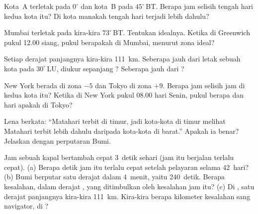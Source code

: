 \begin{exercise}[$\star\star$]\label{exo:g6:latitude-longitude:6}
Kota~A terletak pada  $0^\circ$ dan kota~B pada  $45^\circ$\,BT.
Berapa jam selisih tengah hari kedua kota itu? Di kota manakah tengah hari
terjadi lebih dahulu?
\end{exercise}

\begin{exercise}[$\star\star$]\label{exo:g6:latitude-longitude:7}
Mumbai terletak pada kira-kira $73^\circ$\,BT. Tentukan  idealnya.
Ketika di Greenwich pukul 12.00 siang, pukul berapakah di Mumbai, menurut
zona ideal?
\end{exercise}

\begin{exercise}[$\star\star$]\label{exo:g6:latitude-longitude:8}
Setiap derajat  panjangnya kira-kira \qty{111}{km}. Seberapa jauh dari
 letak sebuah kota pada $30^\circ$\,LU, diukur sepanjang
? Seberapa jauh  dari ?
\end{exercise}

\begin{exercise}[$\star\star$]\label{exo:g6:latitude-longitude:9}
New York berada di zona $-5$ dan Tokyo di zona $+9$. Berapa jam selisih jam
di kedua kota itu? Ketika di New York pukul 08.00 hari Senin, pukul berapa
dan hari apakah di Tokyo?
\end{exercise}

\begin{exercise}[$\star\star$]\label{exo:g6:latitude-longitude:10}
Lena berkata: ``Matahari terbit di timur, jadi kota-kota di timur melihat
Matahari terbit lebih dahulu daripada kota-kota di barat.'' Apakah ia benar?
Jelaskan dengan perputaran Bumi.
\end{exercise}

\begin{exercise}[$\star\star\star$]\label{exo:g6:latitude-longitude:11}
Jam sebuah kapal bertambah cepat 3~detik sehari (jam itu berjalan terlalu
cepat). (a) Berapa detik jam itu terlalu cepat setelah pelayaran selama
42~hari? (b) Bumi berputar satu derajat dalam 4~menit, yaitu 240~detik.
Berapa kesalahan, dalam derajat , yang ditimbulkan oleh kesalahan jam
itu? (c) Di , satu derajat  panjangnya kira-kira
\qty{111}{km}. Kira-kira berapa kilometer kesalahan sang navigator, di
?
\end{exercise}

